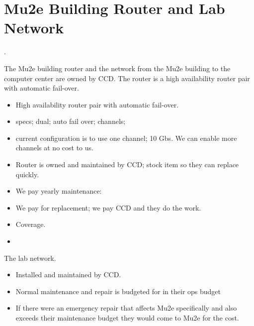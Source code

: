 \chapter{Mu2e Building Router and Lab Network}
\label{app:RouterAndNetwork}.

The Mu2e building router and the network from the Mu2e building to the computer center are owned by CCD.
The router is a high availability router pair with automatic fail-over.

\begin{itemize}
  \item High availability router pair with automatic fail-over.
  \item specs; dual; auto fail over; channels;
  \item current configuration is to use one channel; 10 Gbs.  We can enable more channels at no cost to us.
  \item Router is owned and maintained by CCD; stock item so they can replace quickly.
  \item We pay yearly maintenance: 
  \item We pay for replacement; we pay CCD and they do the work. 
  \item {} Coverage.
  \item {}
\end{itemize}


The lab network.
\begin{itemize}
\item Installed and maintained by CCD.
\item Normal maintenance and repair is budgeted for in their ops budget
\item If there were an emergency repair that affects Mu2e specifically and also exceeds their maintenance budget they would come to Mu2e for the cost.
\end{itemize}
